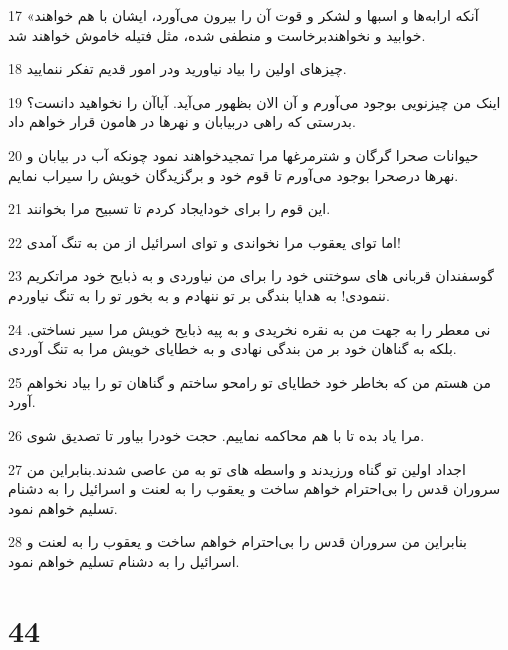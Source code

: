 \par 17 «آنکه ارابه‌ها و اسبها و لشکر و قوت آن را بیرون می‌آورد، ایشان با هم خواهند خوابید و نخواهندبرخاست و منطفی شده، مثل فتیله خاموش خواهند شد.
\par 18 چیزهای اولین را بیاد نیاورید ودر امور قدیم تفکر ننمایید.
\par 19 اینک من چیزنویی بوجود می‌آورم و آن الان بظهور می‌آید. آیاآن را نخواهید دانست؟ بدرستی که راهی دربیابان و نهرها در هامون قرار خواهم داد.
\par 20 حیوانات صحرا گرگان و شترمرغها مرا تمجیدخواهند نمود چونکه آب در بیابان و نهرها درصحرا بوجود می‌آورم تا قوم خود و برگزیدگان خویش را سیراب نمایم.
\par 21 این قوم را برای خودایجاد کردم تا تسبیح مرا بخوانند.
\par 22 اما تو‌ای یعقوب مرا نخواندی و تو‌ای اسرائیل از من به تنگ آمدی!
\par 23 گوسفندان قربانی های سوختنی خود را برای من نیاوردی و به ذبایح خود مراتکریم ننمودی! به هدایا بندگی بر تو ننهادم و به بخور تو را به تنگ نیاوردم.
\par 24 نی معطر را به جهت من به نقره نخریدی و به پیه ذبایح خویش مرا سیر نساختی. بلکه به گناهان خود بر من بندگی نهادی و به خطایای خویش مرا به تنگ آوردی.
\par 25 من هستم من که بخاطر خود خطایای تو رامحو ساختم و گناهان تو را بیاد نخواهم آورد.
\par 26 مرا یاد بده تا با هم محاکمه نماییم. حجت خودرا بیاور تا تصدیق شوی.
\par 27 اجداد اولین تو گناه ورزیدند و واسطه های تو به من عاصی شدند.بنابراین من سروران قدس را بی‌احترام خواهم ساخت و یعقوب را به لعنت و اسرائیل را به دشنام تسلیم خواهم نمود.
\par 28 بنابراین من سروران قدس را بی‌احترام خواهم ساخت و یعقوب را به لعنت و اسرائیل را به دشنام تسلیم خواهم نمود.
 
\chapter{44}

